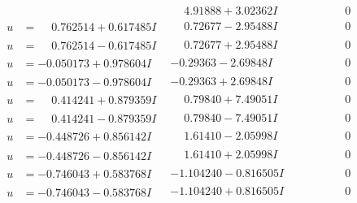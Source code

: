 \documentclass[1p]{elsarticle_modified}
\theoremstyle{definition}
\begin{document}
$$\begin{array}{c|c|c}
 & \phantom{-}4.91888 + 3.02362 I & \phantom{-0.000000 } 0 \\ \hline\begin{aligned}
u &= \phantom{-}0.762514 + 0.617485 I\end{aligned}
 & \phantom{-}0.72677 - 2.95488 I & \phantom{-0.000000 } 0 \\ \hline\begin{aligned}
u &= \phantom{-}0.762514 - 0.617485 I\end{aligned}
 & \phantom{-}0.72677 + 2.95488 I & \phantom{-0.000000 } 0 \\ \hline\begin{aligned}
u &= -0.050173 + 0.978604 I\end{aligned}
 & -0.29363 - 2.69848 I & \phantom{-0.000000 } 0 \\ \hline\begin{aligned}
u &= -0.050173 - 0.978604 I\end{aligned}
 & -0.29363 + 2.69848 I & \phantom{-0.000000 } 0 \\ \hline\begin{aligned}
u &= \phantom{-}0.414241 + 0.879359 I\end{aligned}
 & \phantom{-}0.79840 + 7.49051 I & \phantom{-0.000000 } 0 \\ \hline\begin{aligned}
u &= \phantom{-}0.414241 - 0.879359 I\end{aligned}
 & \phantom{-}0.79840 - 7.49051 I & \phantom{-0.000000 } 0 \\ \hline\begin{aligned}
u &= -0.448726 + 0.856142 I\end{aligned}
 & \phantom{-}1.61410 - 2.05998 I & \phantom{-0.000000 } 0 \\ \hline\begin{aligned}
u &= -0.448726 - 0.856142 I\end{aligned}
 & \phantom{-}1.61410 + 2.05998 I & \phantom{-0.000000 } 0 \\ \hline\begin{aligned}
u &= -0.746043 + 0.583768 I\end{aligned}
 & -1.104240 - 0.816505 I & \phantom{-0.000000 } 0 \\ \hline\begin{aligned}
u &= -0.746043 - 0.583768 I\end{aligned}
 & -1.104240 + 0.816505 I & \phantom{-0.000000 } 0 \\ \hline\begin{aligned}

\end{aligned}
\end{array}$$
\end{document}
